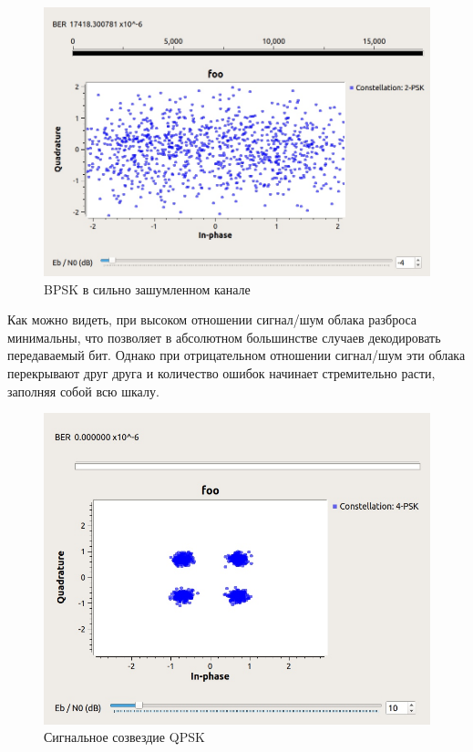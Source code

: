 	\begin{figure}[H]
		\begin{center}
			\includegraphics[scale=0.4]{../bpsk_noisy.jpg}
			\caption{BPSK в сильно зашумленном канале} 
		\end{center}
	\end{figure}
	
	Как можно видеть, при высоком отношении сигнал/шум облака разброса минимальны, что позволяет в абсолютном большинстве случаев декодировать передаваемый бит. Однако при отрицательном отношении сигнал/шум эти облака перекрывают друг друга и количество ошибок начинает стремительно расти, заполняя собой всю шкалу. 

	\begin{figure}[H]
		\begin{center}
			\includegraphics[scale=0.4]{../qpks.jpg}
			\caption{Сигнальное созвездие QPSK} 
		\end{center}
	\end{figure}

